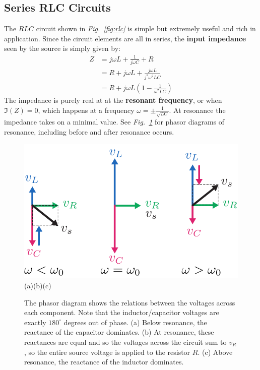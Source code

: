 \subsection{Series RLC Circuits} \label{sec:lcr}
The $RLC$ circuit shown in \emph{Fig.~\ref{fig:rlc}} is simple but extremely useful and rich in application.  Since the circuit elements are all in series, the \textbf{input impedance} seen by the source is simply given by:
    \begin{align*}
        Z &= j\omega L + \frac{1}{j\omega C} + R\\
        &= R + j\omega L + \frac{j\omega L}{j^2{\omega}^2 LC}\\
        &= R + j\omega L \left( 1 - \frac{1}{\omega^2 LC}\right)
    \end{align*}
The impedance is purely real at at the \textbf{resonant frequency}, or when $\Im(Z) = 0$, which happens at a frequency $\omega = \pm \frac{1}{\sqrt{L C}}$.  At resonance the impedance takes on a minimal value.  See \emph{Fig.~\ref{fig:rlcphasor}} for phasor diagrams of resonance, including before and after resonance occurs.
\begin{figure}[H]
\centering
\includegraphics[scale=.95]{rlcphasor}\\
(a)\hspace{3.5cm}(b)\hspace{3.3cm}(c)
\caption{The phasor diagram shows the relations between the voltages across each component.  Note that the inductor/capacitor voltages are exactly $180^\circ$ degrees out of phase.  (a) Below resonance, the reactance of the capacitor dominates.  (b) At resonance, these reactances are equal and so the voltages across the circuit sum to $v_R$, so the entire source voltage is applied to the resistor $R$.  (c) Above resonance, the reactance of the inductor dominates.}
\label{fig:rlcphasor}
\end{figure}
\newpage
